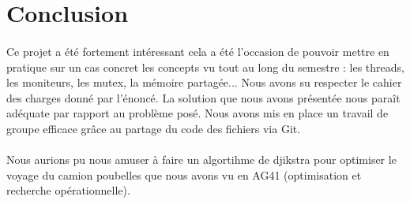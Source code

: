 \documentclass[12pt]{article}
\begin{document}
\section{Conclusion}
\paragraph{}Ce projet a été fortement intéressant cela a été l'occasion de pouvoir mettre en pratique sur un cas concret les concepts vu tout au long du semestre : les threads, les moniteurs, les mutex, la mémoire partagée... Nous avons su respecter le cahier des charges donné par l'énoncé. La solution que nous avons présentée nous paraît adéquate par rapport au problème posé. Nous avons mis en place un travail de groupe efficace grâce au partage du code des fichiers via Git.
\paragraph{}Nous aurions pu nous amuser à faire un algortihme de djikstra pour optimiser le voyage du camion poubelles que nous avons vu en AG41 (optimisation et recherche opérationnelle).
\end{document}
